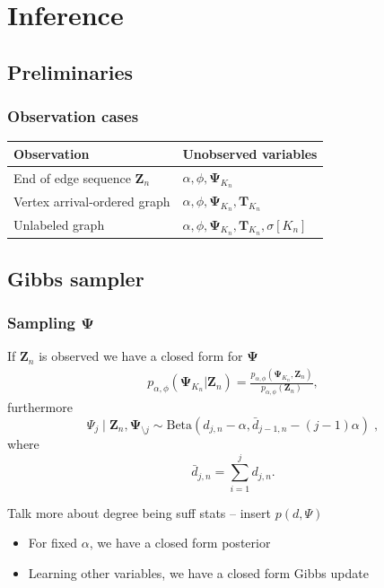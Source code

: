 \documentclass[final,hyperref={pdfpagelabels=false},noamsthm]{beamer}
\newcommand{\ee}{Z} %
\newcommand{\bfee}{\mathbf{\ee}}
\newcommand{\bfT}{\mathbf{T}}
\newcommand{\bfPsi}{\boldsymbol{\Psi}}
\begin{document}
\section{Inference}
\subsection{Preliminaries}
\begin{frame}
	\frametitle{Observation cases}
	\begin{center}
		\begin{tabular}{ll}
			\textbf{Observation} & \textbf{Unobserved variables} \\
			\hline
			End of edge sequence $\bfee_n$ & $\alpha,\phi,\bfPsi_{K_n}$ \\
			Vertex arrival-ordered graph & $\alpha,\phi,\bfPsi_{K_n}, \bfT_{K_n}$ \\
			Unlabeled graph & $\alpha,\phi,\bfPsi_{K_n},\bfT_{K_n},\sigma [K_n]$
		\end{tabular}
	\end{center}
\end{frame}

\subsection{Gibbs sampler}
\begin{frame}
\frametitle{Sampling $\bfPsi$}

If $\bfee_n$ is observed we have a closed form for $\bfPsi$
\begin{align*}
	p_{\alpha, \phi}(\bfPsi_{K_n}| \bfee_n) = \frac{p_{\alpha, \phi}(\bfPsi_{K_n}, \bfee_n)}{p_{\alpha, \phi}(\bfee_n)},
\end{align*}
furthermore
\begin{equation*}
	\Psi_j \mid \bfee_n, \bfPsi_{\setminus j} \sim \text{Beta}(d_{j,n} - \alpha, \bar{d}_{j-1,n} - (j-1)\alpha) \;,
\end{equation*}
where
\begin{equation*}
	\bar{d}_{j,n} = \sum_{i=1}^j d_{j,n}.
\end{equation*}

Talk more about degree being suff stats -- insert $p(d, \Psi)$

\begin{itemize}
	\item For fixed $\alpha$, we have a closed form posterior
	\item Learning other variables, we have a closed form Gibbs update
\end{itemize}
\end{frame}
\end{document}
